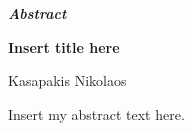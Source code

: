 \thispagestyle{plain}
\vspace*{\fill}
\begin{center}
    \LARGE
    \textit{\textbf{Abstract}}
        
    \vspace{0.4cm}
    \large
    \textbf{Insert title here}
        
    \vspace{0.4cm}
    Kasapakis Nikolaos
\end{center}
\normalsize

\vspace{0.9cm}

Insert my abstract text here.

\vspace*{\fill}



